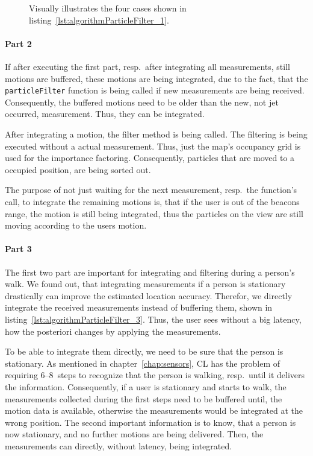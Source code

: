 

\begin{figure}
	
	\caption{Visually illustrates the four cases shown in listing~\ref{lst:algorithmParticleFilter_1}.}
	\label{fig:algo_pf_1}
\end{figure}


\paragraph{Part 2} If after executing the first part, resp.\ after integrating all measurements, still motions are buffered, these motions are being integrated, due to the fact, that the \texttt{particleFilter} function is being called if new measurements are being received. Consequently, the buffered motions need to be older than the new, not jet occurred, measurement. Thus, they can be integrated.

After integrating a motion, the filter method is being called. The filtering is being executed without a actual measurement. Thus, just the map's occupancy grid is used for the importance factoring. Consequently, particles that are moved to a occupied position, are being sorted out.

The purpose of not just waiting for the next measurement, resp.\ the function's call, to integrate the remaining motions is, that if the user is out of the beacons range, the motion is still being integrated, thus the particles on the view are still moving according to the users motion.




\paragraph{Part 3}The first two part are important for integrating and filtering during a person's walk. We found out, that integrating measurements if a person is stationary drastically can improve the estimated location accuracy. Therefor, we directly integrate the received measurements instead of buffering them, shown in listing~\ref{lst:algorithmParticleFilter_3}. Thus, the user sees without a big latency, how the posteriori changes by applying the measurements.

To be able to integrate them directly, we need to be sure that the person is stationary. As mentioned in chapter~\ref{chap:sensors}, \acs{CL} has the problem of requiring 6--8~steps to recognize that the person is walking, resp.\ until it delivers the information. Consequently, if a user is stationary and starts to walk, the measurements collected during the first steps need to be buffered until, the motion data is available, otherwise the measurements would be integrated at the wrong position. The second important information is to know, that a person is now stationary, and no further motions are being delivered. Then, the measurements can directly, without latency, being integrated.

